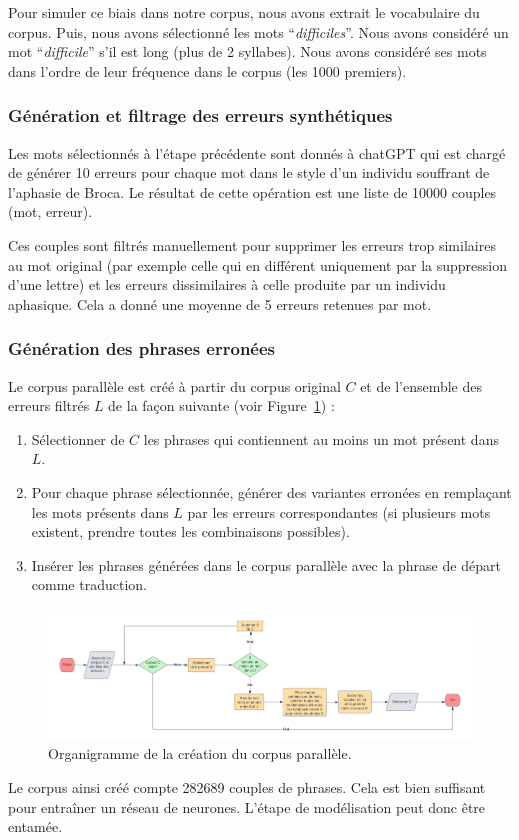 Pour simuler ce biais dans notre corpus, nous avons extrait le vocabulaire du corpus.
Puis, nous avons sélectionné les mots ``\emph{difficiles}''. 
Nous avons considéré un mot ``\emph{difficile}'' s'il est long (plus de 2 syllabes).
Nous avons considéré ses mots dans l'ordre de leur fréquence dans le corpus (les 1000 premiers).

\subsubsection{Génération et filtrage des erreurs synthétiques}

Les mots sélectionnés à l'étape précédente sont donnés à chatGPT 
qui est chargé de générer 10 erreurs pour chaque mot dans le style d'un individu souffrant de l'aphasie de Broca.
Le résultat de cette opération est une liste de 10000 couples (mot, erreur).

Ces couples sont filtrés manuellement pour supprimer les erreurs trop similaires au mot original 
(par exemple celle qui en différent uniquement par la suppression d'une lettre)
et les erreurs dissimilaires à celle produite par un individu aphasique.
Cela a donné une moyenne de 5 erreurs retenues par mot.

\subsubsection{Génération des phrases erronées}

Le corpus parallèle est créé à partir du corpus original \(C\) et de l'ensemble des erreurs filtrés \(L\) 
de la façon suivante (voir Figure~\ref{fig:flow-corpus}) :

\begin{enumerate}
    \item Sélectionner de \(C\) les phrases qui contiennent au moins un mot présent dans \(L\).
    \item Pour chaque phrase sélectionnée, générer des variantes erronées en remplaçant les mots présents dans \(L\)
    par les erreurs correspondantes (si plusieurs mots existent, prendre toutes les combinaisons possibles).
    \item Insérer les phrases générées dans le corpus parallèle avec la phrase de départ comme traduction.
\end{enumerate}
\begin{figure}[hbt]
    \begin{center}
        \includegraphics[width=\textwidth]{assets/pdf/flow.pdf}
    \end{center}
    \caption{Organigramme de la création du corpus parallèle.}
    \label{fig:flow-corpus}
\end{figure}
Le corpus ainsi créé compte 282689 couples de phrases.
Cela est bien suffisant pour entraîner un réseau de neurones.
L'étape de modélisation peut donc être entamée.
